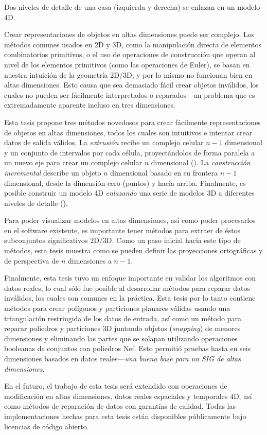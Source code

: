 {{\caption[Dos niveles de detalle de una casa se enlazan en un modelo 4D]{Dos niveles de detalle de una casa (izquierda y derecha) se enlazan en un modelo 4D.}
\label{fig:link-sum-es}
}
Crear representaciones de objetos en altas dimensiones puede ser complejo.
Los métodos comunes usados en 2D y 3D, como la manipulación directa de elementos combinatorios primitivos, o el uso de operaciones de construcción que operan al nivel de los elementos primitivos (como las operaciones de Euler), se basan en nuestra intuición de la geometría 2D/3D, y por lo mismo no funcionan bien en altas dimensiones.
Esto causa que sea demasiado fácil crear objetos inválidos, los cuales no pueden ser fácilmente interpretados o reparados---un problema que es extremadamente aparente incluso en tres dimensiones.

Esta tesis propone tres métodos novedosos para crear fácilmente representaciones de objetos en altas dimensiones, todos los cuales son intuitivos e intentar crear datos de salida válidos.
La \emph{extrusión} recibe un complejo celular $n-1$ dimensional y un conjunto de intervalos por cada célula, proyectándolos de forma paralela a un nuevo eje para crear un complejo celular $n$ dimensional ().
La \emph{construcción incremental} describe un objeto $n$ dimensional basado en su frontera $n-1$ dimensional, desde la dimensión cero (puntos) y hacia arriba.
Finalmente, es posible construir un modelo 4D \emph{enlazando} una serie de modelos 3D a diferentes niveles de detalle ().

Para poder visualizar modelos en altas dimensiones, así como poder procesarlos en el software existente, es importante tener métodos para extraer de éstos subconjuntos significativos 2D/3D.
Como un paso inicial hacia este tipo de métodos, esta tesis muestra como se pueden definir las proyecciones ortográficas y de perspectiva de $n$ dimensiones a $n-1$.

Finalmente, esta tesis tuvo un enfoque importante en validar los algoritmos con datos reales, lo cual sólo fue posible al desarrollar métodos para reparar datos inválidos, los cuales son comunes en la práctica.
Esta tesis por lo tanto contiene métodos para crear polígonos y particiones planares válidas usando una triangulación restringida de los datos de entrada, así como un método para reparar poliedros y particiones 3D juntando objetos (\emph{snapping}) de menores dimensiones y eliminando las partes que se solapan utilizando operaciones booleanas de conjuntos con poliedros Nef.
Esto permitió pruebas hasta en seis dimensiones basados en datos reales---\emph{una buena base para un SIG de altas dimensiones}.

En el futuro, el trabajo de esta tesis será extendido con operaciones de modificación en altas dimensiones, datos reales espaciales y temporales 4D, así como métodos de reparación de datos con garantías de calidad.
Todas las implementaciones hechas para esta tesis están disponibles públicamente bajo licencias de código abierto.

}
